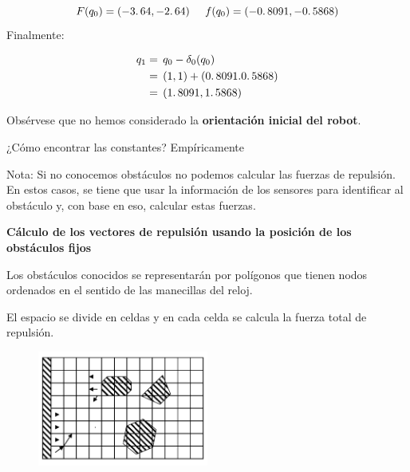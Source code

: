 $$
F(q_0) =(-3\ldotp64,-2\ldotp64) \hspace{0.5cm} f(q_0)=(-0\ldotp8091,-0\ldotp 5868)
$$
Finalmente:


\begin{equation*}
\begin{aligned}
q_1 & = \,  q_0-\delta_0 (q_0) \\
 & = \, (1,1)+(0\ldotp8091.0\ldotp5868) \\
 & = \, (1\ldotp8091,1\ldotp5868) 
\end{aligned}
\end{equation*}

Obsérvese que no hemos considerado la \textbf{orientación inicial del robot}.



¿Cómo encontrar las constantes? Empíricamente

Nota: Si no conocemos obstáculos no podemos calcular las fuerzas de repulsión. En estos casos, se tiene que usar la información de los sensores para identificar al obstáculo y, con base en eso, calcular estas fuerzas.

\textbf{Cálculo de los vectores de repulsión usando la posición de los obstáculos fijos}

Los obstáculos conocidos se representarán por polígonos que tienen nodos ordenados en el sentido de las manecillas del reloj.

El espacio se divide en celdas y en cada celda se calcula la fuerza total de repulsión.

\begin{figure}[h!]
	\centering
	\includegraphics[width=0.5\textwidth]{images/img60.png}
	\label{figura60}
\end{figure}

